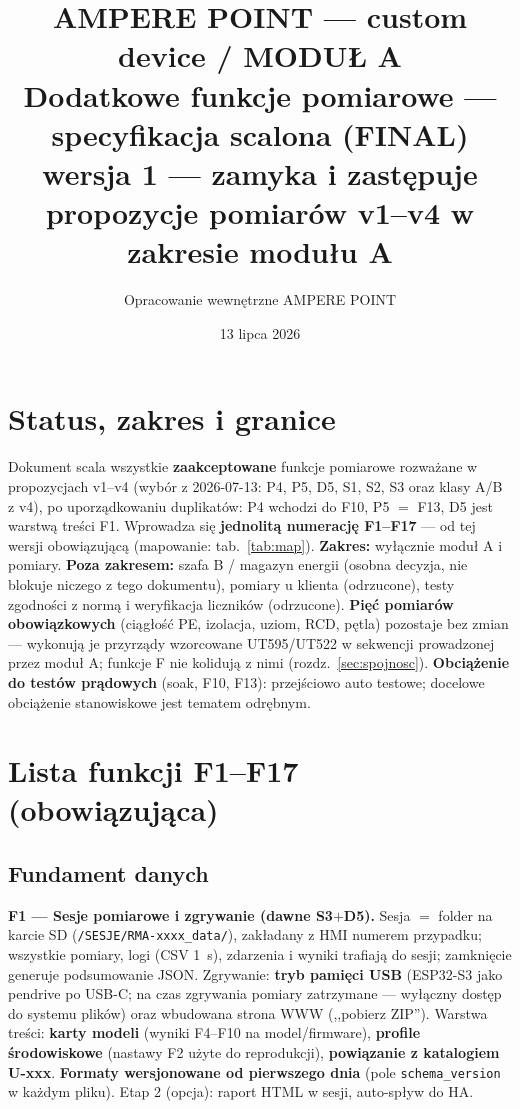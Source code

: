 \documentclass[11pt,a4paper]{article}
\title{\textbf{AMPERE POINT --- custom device / MODUŁ A}\\[4pt]
\large Dodatkowe funkcje pomiarowe --- specyfikacja scalona (FINAL)\\[2pt]
\normalsize wersja 1 --- zamyka i zastępuje propozycje pomiarów v1--v4 w zakresie modułu A}
\author{Opracowanie wewnętrzne AMPERE POINT}
\date{13 lipca 2026}
\begin{document}
\maketitle
\vspace{-1.4em}

\section{Status, zakres i granice}
Dokument scala wszystkie \textbf{zaakceptowane} funkcje pomiarowe rozważane w propozycjach v1--v4
(wybór z 2026-07-13: P4, P5, D5, S1, S2, S3 oraz klasy A/B z v4), po uporządkowaniu duplikatów:
P4 wchodzi do F10, P5 $=$ F13, D5 jest warstwą treści F1. Wprowadza się \textbf{jednolitą numerację
F1--F17} --- od tej wersji obowiązującą (mapowanie: tab.~\ref{tab:map}).
\textbf{Zakres:} wyłącznie moduł A i pomiary. \textbf{Poza zakresem:} szafa B / magazyn energii
(osobna decyzja, nie blokuje niczego z tego dokumentu), pomiary u klienta (odrzucone), testy
zgodności z normą i weryfikacja liczników (odrzucone). \textbf{Pięć pomiarów obowiązkowych}
(ciągłość PE, izolacja, uziom, RCD, pętla) pozostaje bez zmian --- wykonują je przyrządy
wzorcowane UT595/UT522 w sekwencji prowadzonej przez moduł A; funkcje F nie kolidują z nimi
(rozdz.~\ref{sec:spojnosc}). \textbf{Obciążenie do testów prądowych} (soak, F10, F13): przejściowo
auto testowe; docelowe obciążenie stanowiskowe jest tematem odrębnym.

\section{Lista funkcji F1--F17 (obowiązująca)}
\label{sec:lista}
\subsection{Fundament danych}
\textbf{F1 --- Sesje pomiarowe i zgrywanie (dawne S3$+$D5).} Sesja $=$ folder na karcie SD
(\texttt{/SESJE/RMA-xxxx\_data/}), zakładany z HMI numerem przypadku; wszystkie pomiary, logi
(CSV 1~s), zdarzenia i wyniki trafiają do sesji; zamknięcie generuje podsumowanie JSON.
Zgrywanie: \textbf{tryb pamięci USB} (ESP32-S3 jako pendrive po USB-C; na czas zgrywania pomiary
zatrzymane --- wyłączny dostęp do systemu plików) oraz wbudowana strona WWW (,,pobierz ZIP'').
Warstwa treści: \textbf{karty modeli} (wyniki F4--F10 na model/firmware), \textbf{profile
środowiskowe} (nastawy F2 użyte do reprodukcji), \textbf{powiązanie z katalogiem U-xxx}.
\textbf{Formaty wersjonowane od pierwszego dnia} (pole \texttt{schema\_version} w każdym pliku).
Etap 2 (opcja): raport HTML w sesji, auto-spływ do HA.
\end{document}
